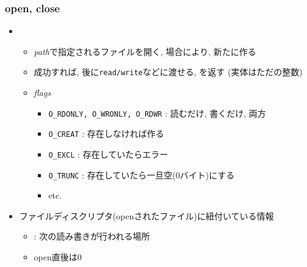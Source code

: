 \documentclass[12pt,dvipdfmx]{beamer}
\begin{document}
\begin{frame}
  \frametitle{open, close}
  \begin{itemize}
  \item {}
    \begin{itemize}
    \item {\it path}で指定されるファイルを開く, 場合により, 新たに作る
    \item 成功すれば, 後に{\tt read/write}などに渡せる,
      を返す (実体はただの整数)
    \item {\it flags}
      \begin{itemize}
      \item {\tt O\_RDONLY, O\_WRONLY, O\_RDWR} : 読むだけ, 書くだけ, 両方
      \item {\tt O\_CREAT} : 存在しなければ作る
      \item {\tt O\_EXCL} : 存在していたらエラー
      \item {\tt O\_TRUNC} : 存在していたら一旦空(0バイト)にする
      \item etc.
      \end{itemize}
    \end{itemize}
  \item ファイルディスクリプタ(openされたファイル)に紐付いている情報
    \begin{itemize}
    \item {} : 次の読み書きが行われる場所
    \item open直後は0
    \end{itemize}
  \end{itemize}
\end{frame}
\end{document}

